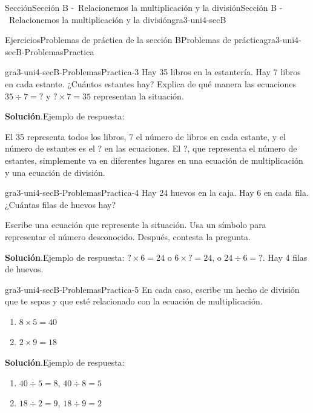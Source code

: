 \documentclass[oneside,10pt,]{article}
\newcommand{\blocktitlefont}{\relax}
\begin{document}
\begin{sectionptx}{Sección}{Sección B -~Relacionemos la multiplicación y la división}{}{Sección B -~Relacionemos la multiplicación y la división}{}{}{gra3-uni4-secB}
\begin{exercises-subsection}{Ejercicios}{Problemas de práctica de la sección B}{}{Problemas de práctica}{}{}{gra3-uni4-secB-ProblemasPractica}
\begin{divisionexercise}{1}{}{}{gra3-uni4-secB-ProblemasPractica-3}%
Hay 35 libros en la estantería. Hay 7 libros en cada estante. ¿Cuántos estantes hay? Explica de qué manera las ecuaciones \(35 \div 7 = {?}\) y \({?} \times 7 = 35\) representan la situación.%
\par\smallskip%
\noindent\textbf{\blocktitlefont Solución}.\hypertarget{gra3-uni4-secB-ProblemasPractica-3-2}{}\quad{}Ejemplo de respuesta:%
\par
El 35 representa todos los libros, 7 el número de libros en cada estante, y el número de estantes es el ? en las ecuaciones. El ?, que representa el número de estantes, simplemente va en diferentes lugares en una ecuación de multiplicación y una ecuación de división.%
\end{divisionexercise}%
\begin{divisionexercise}{2}{}{}{gra3-uni4-secB-ProblemasPractica-4}%
Hay 24 huevos en la caja. Hay 6 en cada fila. ¿Cuántas filas de huevos hay?%
\par
Escribe una ecuación que represente la situación. Usa un símbolo para representar el número desconocido. Después, contesta la pregunta.%
\par\smallskip%
\noindent\textbf{\blocktitlefont Solución}.\hypertarget{gra3-uni4-secB-ProblemasPractica-4-2}{}\quad{}Ejemplo de respuesta: \({?} \times 6 = 24\) o \(6 \times {?} = 24\), o \(24 \div 6 = {?} \). Hay 4 filas de huevos.%
\end{divisionexercise}%
\begin{divisionexercise}{3}{}{}{gra3-uni4-secB-ProblemasPractica-5}%
En cada caso, escribe un hecho de división que te sepas y que esté relacionado con la ecuación de multiplicación.%
%
\begin{enumerate}[label={(\alph*)}]
\item{}\(\displaystyle 8 \times 5 = 40\)%
\item{}\(\displaystyle 2 \times 9 = 18\)%
\end{enumerate}
\par\smallskip%
\noindent\textbf{\blocktitlefont Solución}.\hypertarget{gra3-uni4-secB-ProblemasPractica-5-2}{}\quad{}Ejemplo de respuesta:%
%
\begin{enumerate}[label={(\alph*)}]
\item{}\(40 \div 5 = 8\), \(40 \div 8 = 5\)%
\item{}\(18 \div 2 = 9\), \(18 \div 9 = 2\)%
\end{enumerate}
\end{divisionexercise}%

\end{exercises-subsection}
\end{sectionptx}
\end{document}

